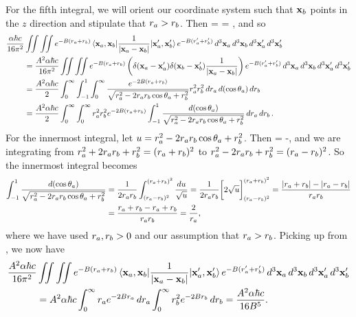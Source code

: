 \begin{solution}
	For the fifth integral, we will orient our coordinate system such that $\vb{x}_b$ points in the $z$ direction and stipulate that $r_a > r_b$.  Then
	\beq
		 = 
		= ,
	\eeq
	and so
	\begin{align}
		\frac{\alpha \hbar c}{16\pi^2} &\iint \iint e^{-B(r_a + r_b)} \mel{\vb{x}_a, \vb{x}_b}{\frac{1}{\abs{\vb{x}_a- \vb{x}_b}}}{\vb{x}_a', \vb{x}_b'} e^{-B(r_a' + r_b')} \dd[3]{\vb{x}_a} \dd[3]{\vb{x}_b} \dd[3]{\vb{x}_a'} \dd[3]{\vb{x}_b'} \notag \\
		&= \frac{A^2 \alpha \hbar c}{16\pi^2} \iint \iint e^{-B(r_a + r_b)}  \left( \delta(\vb{x}_a - \vb{x}_a') \delta(\vb{x}_b - \vb{x}_b') \frac{1}{\abs{\vb{x}_a - \vb{x}_b}} \right) e^{-B(r_a' + r_b')} \dd[3]{\vb{x}_a} \dd[3]{\vb{x}_b} \dd[3]{\vb{x}_a'} \dd[3]{\vb{x}_b'} \notag \\
		&= \frac{A^2 \alpha \hbar c}{2} \int_0^\infty \int_{-1}^1 \int_0^\infty \frac{e^{-2B(r_a + r_b)}}{\sqrt{r_a^2 - 2 r_a r_b \cos\theta_a + r_b^2}} r_a^2 r_b^2 \dd{r_a} \dd{(\cos\theta_a)} \dd{r_b} \notag \\
		&= \frac{A^2 \alpha \hbar c}{2} \int_0^\infty \int_0^\infty r_a^2 r_b^2 e^{-2B(r_a + r_b)} \int_{-1}^1 \frac{\dd{(\cos\theta_a)}}{\sqrt{r_a^2 - 2 r_a r_b \cos\theta_a + r_b^2}} \dd{r_a} \dd{r_b}. \label{leftoff}
	\end{align}
	For the innermost integral, let $u = r_a^2 - 2 r_a r_b \cos\theta_a + r_b^2$.  Then
	\beq
		\dcta = -\frac{\du}{2 \ra \rb},
	\eeq
	and we are integrating from $r_a^2 + 2 r_a r_b + r_b^2 = (r_a + r_b)^2$ to $r_a^2 - 2 r_a r_b + r_b^2 = (r_a - r_b)^2$.  So the innermost integral becomes
	\begin{align*}
		\int_{-1}^1 \frac{\dd{(\cos\theta_a)}}{\sqrt{r_a^2 - 2 r_a r_b \cos\theta_a + r_b^2}} &= \frac{1}{2 r_a r_b} \int_{(r_a - r_b)^2}^{(r_a + r_b)^2} \frac{\dd{u}}{\sqrt{u}}
		= \frac{1}{2 r_a r_b} \bigg[ 2 \sqrt{u} \bigg]_{(r_a - r_b)^2}^{(r_a + r_b)^2}
		= \frac{\abs{r_a + r_b} - \abs{r_a - r_b}}{r_a r_b} \\
		&= \frac{r_a + r_b - r_a + r_b}{r_a r_b}
		= \frac{2}{r_a},
	\end{align*}
	where we have used $r_a, r_b > 0$ and our assumption that $r_a > r_b$.  Picking up from , we now have
	\begin{align*}
		\frac{A^2 \alpha \hbar c}{16\pi^2} &\iint \iint e^{-B(r_a + r_b)} \mel{\vb{x}_a, \vb{x}_b}{\frac{1}{\abs{\vb{x}_a- \vb{x}_b}}}{\vb{x}_a', \vb{x}_b'} e^{-B(r_a' + r_b')} \dd[3]{\vb{x}_a} \dd[3]{\vb{x}_b} \dd[3]{\vb{x}_a'} \dd[3]{\vb{x}_b'} \\
		&= A^2 \alpha \hbar c \int_0^\infty r_a e^{-2B r_a} \dd{r_a} \int_0^\infty r_b^2 e^{-2B r_b} \dd{r_b}
		= \frac{A^2 \alpha \hbar c}{16 B^5}.
	\end{align*}
	

\end{solution}
